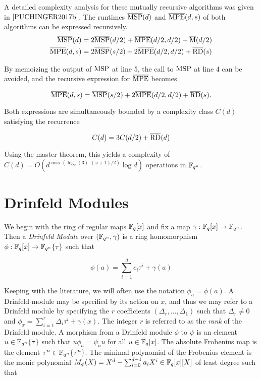 A detailed complexity analysis for these mutually recursive algorithms was given in $\cite{PUCHINGER2017b}$. The runtimes $\overline{\textnormal{MSP}}(d)$ and $\overline{\textnormal{MPE}}(d, s)$ of both algorithms can be expressed recursively.
\begin{align*}
    \overline{\textnormal{MSP}}(d) & = 2\overline{\textnormal{MSP}}(d/2) + \overline{\textnormal{MPE}}(d/2, d/2) + \overline{\textnormal{M}}(d/2) \\
    \overline{\textnormal{MPE}}(d, s) & = 2\overline{\textnormal{MSP}}(s/2) + 2\overline{\textnormal{MPE}}(d/2, d/2) + \overline{\textnormal{RD}}(s)
\end{align*}

By memoizing the output of $\textnormal{MSP}$ at line 5, the call to $\textnormal{MSP}$ at line 4 can be avoided, and the recursive expression for $\overline{\textnormal{MPE}}$ becomes

\begin{equation*}
    \overline{\textnormal{MPE}}(d, s) = \overline{\textnormal{MSP}}(s/2) + 2\overline{\textnormal{MPE}}(d/2, d/2) + \overline{\textnormal{RD}}(s).
\end{equation*}

Both expressions are simultaneously bounded by a complexity class $C(d)$ satisfying the recurrence

\begin{equation*}
    C(d) = 3C(d/2) + \overline{\textnormal{RD}}(d)
\end{equation*}

Using the master theorem, this yields a complexity of $C(d) = O(d^{\max(\log_2(3), (\omega + 1)/2)}\log d)$ operations in $\mathbb{F}_{q^n}$.



\section{Drinfeld Modules}

We begin with the ring of regular maps $\mathbb{F}_q[x]$ and fix a map $\gamma : \mathbb{F}_q[x] \to \mathbb{F}_{q^n}$. Then a \textit{Drinfeld Module} over $(\mathbb{F}_{q^n}, \gamma)$ is a ring homomorphism $\phi: \mathbb{F}_q[x] \to \mathbb{F}_{q^n}\{\tau \}$ such that

\begin{equation*}
    \phi(a) = \sum_{i=1}^{d}c_i\tau^i + \gamma(a)
\end{equation*}

Keeping with the literature, we will often use the notation $\phi_a = \phi(a)$. A Drinfeld module may be specified by its action on $x$, and thus we may refer to a Drinfeld module by specifying the $r$ coefficients $(\Delta_r, \ldots, \Delta_1)$ such that $\Delta_r \neq 0$ and $\phi_x = \sum_{i=1}^{r}\Delta_i \tau^i + \gamma(x)$. The integer $r$ is referred to as the \textit{rank} of the Drinfeld module. A morphism from a Drinfeld module $\phi$ to $\psi$ is an element $u \in \mathbb{F}_{q^n}\{ \tau\}$  such that $u \phi_a = \psi_a u$ for all $u \in \mathbb{F}_q[x]$. The absolute Frobenius map is the element $\tau^n \in \mathbb{F}_{q^n}\{ \tau^n \}$. The minimal polynomial of the Frobenius element is the monic polynomial $M_{\phi}(X) = X^d - \sum_{i=0}^{d-1} a_iX^i \in \mathbb{F}_q[x][X]$ of least degree such that 

